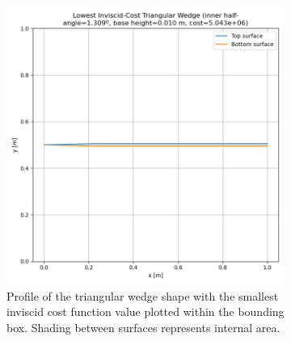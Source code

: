 \documentclass[11pt]{article}
\begin{document}
\begin{figure}[H]
\begin{subfigure}[b]{0.44\textwidth}
    \includegraphics[width=\linewidth]{../results/inviscid/lowest_cost_wedge.png}
    \caption{Profile of the triangular wedge shape with the smallest inviscid cost function value plotted within the bounding box. Shading between surfaces represents internal area.}
    \label{fig:inv-wedge-b}
\end{subfigure}
\caption{}
\label{fig:inv-wedge}
\end{figure}
\end{document}
